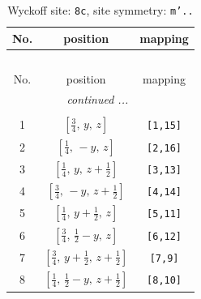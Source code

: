 \documentclass[fleqn,8pt]{jsarticle}
\begin{document}
\begin{longtable}{ccc}
\caption{Wyckoff site: {\tt 8c}, site symmetry: {\tt m'..}}
 \\
 \hline \hline
No. & position & mapping \\ \hline \endfirsthead

\multicolumn{2}{l}{\tablename\ \thetable{}} \\
 \hline \hline
No. & position & mapping \\ \hline \endhead

 \hline \hline
\multicolumn{2}{r}{\footnotesize\it continued ...} \\ \endfoot

 \hline \hline
\multicolumn{2}{r}{} \\ \endlastfoot

1 & $\left[ \frac{3}{4},\, y,\, z \right]$ & {\tt [1,15]} \\ \hline
2 & $\left[ \frac{1}{4},\, - y,\, z \right]$ & {\tt [2,16]} \\ \hline
3 & $\left[ \frac{1}{4},\, y,\, z + \frac{1}{2} \right]$ & {\tt [3,13]} \\ \hline
4 & $\left[ \frac{3}{4},\, - y,\, z + \frac{1}{2} \right]$ & {\tt [4,14]} \\ \hline
5 & $\left[ \frac{1}{4},\, y + \frac{1}{2},\, z \right]$ & {\tt [5,11]} \\ \hline
6 & $\left[ \frac{3}{4},\, \frac{1}{2} - y,\, z \right]$ & {\tt [6,12]} \\ \hline
7 & $\left[ \frac{3}{4},\, y + \frac{1}{2},\, z + \frac{1}{2} \right]$ & {\tt [7,9]} \\ \hline
8 & $\left[ \frac{1}{4},\, \frac{1}{2} - y,\, z + \frac{1}{2} \right]$ & {\tt [8,10]} \\
\end{longtable}
\renewcommand{\arraystretch}{1.2}
\end{document}
